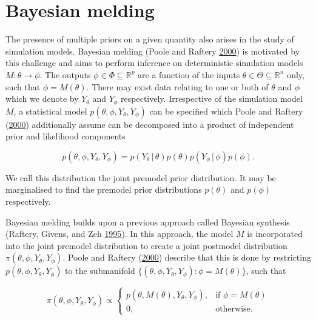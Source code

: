 \documentclass[11pt,]{book}
\begin{document}
\section{\texorpdfstring{Bayesian melding
\label{sec:bayesianmelding}}{Bayesian melding }}\label{bayesian-melding}

The presence of multiple priors on a given quantity also arises in the
study of simulation models. Bayesian melding (Poole and Raftery
\protect\hyperlink{ref-poole2000inference}{2000}) is motivated by this
challenge and aims to perform inference on deterministic simulation
models \(M: \theta \to \phi\). The outputs
\(\phi \in \Phi \subseteq \mathbb{R}^p\) are a function of the inputs
\(\theta \in \Theta \subseteq \mathbb{R}^n\) only, such that
\(\phi = M(\theta)\). There may exist data relating to one or both of
\(\theta\) and \(\phi\) which we denote by \(Y_\theta\) and \(Y_\phi\)
respectively. Irrespective of the simulation model \(M\), a statistical
model \(p(\theta, \phi, Y_\theta, Y_\phi)\) can be specified which Poole
and Raftery (\protect\hyperlink{ref-poole2000inference}{2000})
additionally assume can be decomposed into a product of independent
prior and likelihood components

\begin{equation}
p(\theta, \phi, Y_\theta, Y_\phi) = p(Y_\theta \, | \, \theta)p(\theta)p(Y_\phi \, | \, \phi)p(\phi).
\end{equation}

We call this distribution the joint premodel prior distribution. It may
be marginalised to find the premodel prior distributions \(p(\theta)\)
and \(p(\phi)\) respectively.

Bayesian melding builds upon a previous approach called Bayesian
synthesis (Raftery, Givens, and Zeh
\protect\hyperlink{ref-raftery1995inference}{1995}). In this approach,
the model \(M\) is incorporated into the joint premodel distribution to
create a joint postmodel distribution
\(\pi(\theta, \phi, Y_\theta, Y_\phi)\). Poole and Raftery
(\protect\hyperlink{ref-poole2000inference}{2000}) describe that this is
done by restricting \(p(\theta, \phi, Y_\theta, Y_\phi)\) to the
submanifold \(\{(\theta, \phi, Y_\theta, Y_\phi):\phi = M(\theta)\}\),
such that

\begin{equation}
\pi(\theta, \phi, Y_\theta, Y_\phi) \propto
\begin{cases}
  p(\theta, M(\theta), Y_\theta, Y_\phi), & \text{if } \phi = M(\theta) \\
  0, & \text{otherwise.}
\end{cases}
\end{equation}
\end{document}
